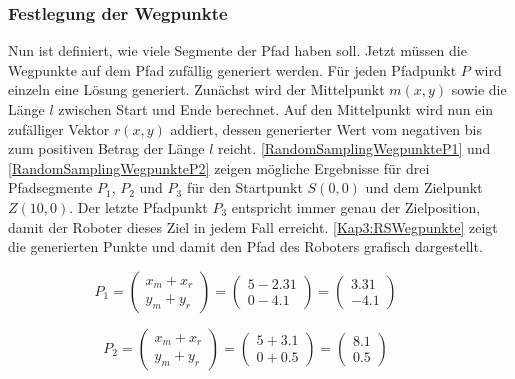 \subsubsection{Festlegung der Wegpunkte}

Nun ist definiert, wie viele Segmente der Pfad haben soll. Jetzt müssen die Wegpunkte auf dem Pfad zufällig generiert werden. Für jeden Pfadpunkt $P$ wird einzeln eine Lösung generiert. Zunächst wird der Mittelpunkt $m(x, y)$ sowie die Länge $l$ zwischen Start und Ende berechnet. Auf den Mittelpunkt wird nun ein zufälliger Vektor $r(x, y)$ addiert, dessen generierter Wert vom negativen bis zum positiven Betrag der Länge $l$ reicht. \autoref{RandomSamplingWegpunkteP1} und \ref{RandomSamplingWegpunkteP2} zeigen mögliche Ergebnisse für drei Pfadsegmente $P_1$, $P_2$ und $P_3$ für den Startpunkt $S(0,0)$ und dem Zielpunkt $Z(10,0)$. Der letzte Pfadpunkt $P_3$ entspricht immer genau der Zielposition, damit der Roboter dieses Ziel in jedem Fall erreicht. \autoref{Kap3:RSWegpunkte} zeigt die generierten Punkte und damit den Pfad des Roboters grafisch dargestellt.

\begin{equation}
  P_1=\left(\begin{array}{c} x_m + x_r \\ y_m + y_r \end{array}\right)=\left(\begin{array}{c} 5 - 2.31 \\ 0 - 4.1 \end{array}\right)=\left(\begin{array}{c} 3.31 \\ -4.1 \end{array}\right) \qquad
\label{RandomSamplingWegpunkteP1}
\end{equation}

\begin{equation}
  P_2=\left(\begin{array}{c} x_m + x_r \\ y_m + y_r \end{array}\right)=\left(\begin{array}{c} 5 + 3.1 \\ 0 + 0.5 \end{array}\right)=\left(\begin{array}{c} 8.1 \\ 0.5 \end{array}\right) \qquad
\label{RandomSamplingWegpunkteP2}
\end{equation}

